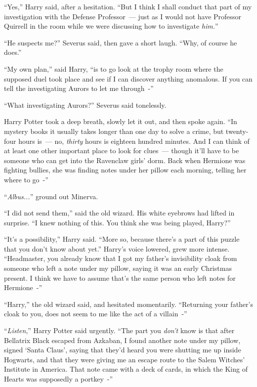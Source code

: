 ``Yes,'' Harry said, after a hesitation. ``But I think I shall conduct that part of my investigation with the Defense Professor~--- just as I would not have Professor Quirrell in the room while we were discussing how to investigate \emph{him.}''

``He suspects me?'' Severus said, then gave a short laugh. ``Why, of course he does.''

``My own plan,'' said Harry, ``is to go look at the trophy room where the supposed duel took place and see if I can discover anything anomalous. If you can tell the investigating Aurors to let me through~-''

``What investigating Aurors?'' Severus said tonelessly.

Harry Potter took a deep breath, slowly let it out, and then spoke again. ``In mystery books it usually takes longer than one day to solve a crime, but twenty-four hours is~--- no, \emph{thirty} hours is eighteen hundred minutes. And I can think of at least one other important place to look for clues~--- though it'll have to be someone who can get into the Ravenclaw girls' dorm. Back when Hermione was fighting bullies, she was finding notes under her pillow each morning, telling her where to go~-''

``\emph{Albus...}'' ground out Minerva.

``I did not send them,'' said the old wizard. His white eyebrows had lifted in surprise. ``I knew nothing of this. You think she was being played, Harry?''

``It's a possibility,'' Harry said. ``More so, because there's a part of this puzzle that you don't know about yet.'' Harry's voice lowered, grew more intense. ``Headmaster, you already know that I got my father's invisibility cloak from someone who left a note under my pillow, saying it was an early Christmas present. I think we have to assume that's the same person who left notes for Hermione~-''

``Harry,'' the old wizard said, and hesitated momentarily. ``Returning your father's cloak to you, does not seem to me like the act of a villain~-''

``\emph{Listen},'' Harry Potter said urgently. ``The part you \emph{don't} know is that after Bellatrix Black escaped from Azkaban, I found another note under my pillow, signed `Santa Claus', saying that they'd heard you were shutting me up inside Hogwarts, and that they were giving me an escape route to the Salem Witches' Institute in America. That note came with a deck of cards, in which the King of Hearts was supposedly a portkey~-''

